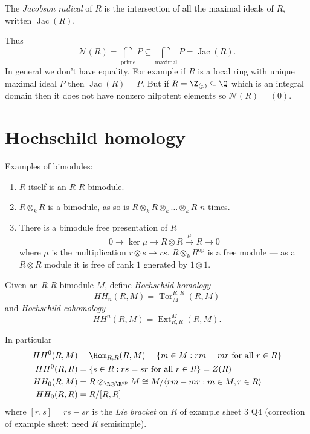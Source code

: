 \documentclass[a4paper]{article}
\newcommand{\nilrad}[1]{\mathcal{N}({#1})} %
\newcommand{\jac}[1]{\operatorname{Jac}({#1})} %
\DeclareMathOperator{\Tor}{Tor}
\DeclareMathOperator{\Ext}{Ext}
\begin{document}
\begin{definition}
  The \emph{Jacobson radical} of \(R\) is the intersection of all the maximal ideals of \(R\), written \(\jac R\).
\end{definition}
Thus
\[
  \nilrad R = \bigcap_{\text{prime}} P \subseteq \bigcap_{\text{maximal}} P = \jac R.
\]
In general we don't have equality. For example if \(R\) is a local ring with unique maximal ideal \(P\) then \(\jac R = P\). But if \(R = \Z_{(p)} \subseteq \Q\) which is an integral domain then it does not have nonzero nilpotent elements so \(\nilrad R = (0)\).


















\iffalse
\section{Hochschild homology}

\begin{eg}
  Examples of bimodules:
  \begin{enumerate}
  \item \(R\) itself is an \(R\)-\(R\) bimodule.
  \item \(R \otimes_k R\) is a bimodule, as so is \(R \otimes_k R \otimes_k \dots \otimes_k R\) \(n\)-times.
  \item There is a bimodule free presentation of \(R\)
    \[
      0 \to \ker \mu \to R \otimes R \xrightarrow{\mu} R \to 0
    \]
    where \(\mu\) is the multiplication \(r \otimes s \to rs\). \(R \otimes_k R^{\text{op}}\) is a free module --- as a \(R \otimes R\) module it is free of rank \(1\) gnerated by \(1 \otimes 1\).
  \end{enumerate}
\end{eg}

\begin{definition}
  Given an \(R\)-\(R\) bimodule \(M\), define \emph{Hochschild homology}
  \[
    HH_n(R, M) = \Tor_M^{R, R} (R, M)
  \]
  and \emph{Hochschild cohomology}
  \[
    HH^n(R, M) = \Ext_{R, R}^M(R, M).
  \]
\end{definition}

In particular
\begin{align*}
  HH^0(R, M) &= \Hom_{R, R} (R, M) = \{m \in M: rm = mr \text{ for all } r \in R\} \\
  HH^0(R, R) &= \{s \in R: rs = sr \text{ for all } r \in R\} = Z(R) \\
  HH_0(R, M) &= R \otimes_{\R \otimes \R^{\text{op}}} M \cong M / \langle rm - mr: m \in M, r \in R \rangle \\
  HH_0(R, R) &= R/[R, R]
\end{align*}
where \([r, s] = rs - sr\) is the \emph{Lie bracket} on \(R\) of example sheet 3 Q4 (correction of example sheet: need \(R\) semisimple).
\end{document}
